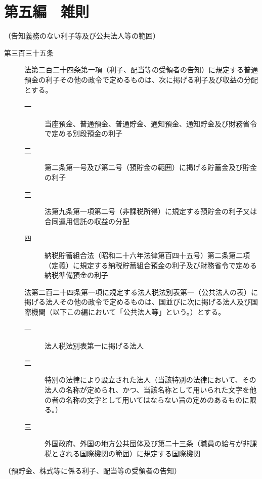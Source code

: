 \documentclass[twocolumn,a4j,10pt]{ltjtarticle}
\begin{document}
\part*{第五編　雑則}
\noindent\hspace{10pt}（告知義務のない利子等及び公共法人等の範囲）
\begin{description}
\item[第三百三十五条]法第二百二十四条第一項（利子、配当等の受領者の告知）に規定する普通預金の利子その他の政令で定めるものは、次に掲げる利子及び収益の分配とする。
\begin{description}
\item[一]当座預金、普通預金、普通貯金、通知預金、通知貯金及び財務省令で定める別段預金の利子
\item[二]第二条第一号及び第二号（預貯金の範囲）に掲げる貯蓄金及び貯金の利子
\item[三]法第九条第一項第二号（非課税所得）に規定する預貯金の利子又は合同運用信託の収益の分配
\item[四]納税貯蓄組合法（昭和二十六年法律第百四十五号）第二条第二項（定義）に規定する納税貯蓄組合預金の利子及び財務省令で定める納税準備預金の利子
\end{description}
\item[]法第二百二十四条第一項に規定する法人税法別表第一（公共法人の表）に掲げる法人その他の政令で定めるものは、国並びに次に掲げる法人及び国際機関（以下この編において「公共法人等」という。）とする。
\begin{description}
\item[一]法人税法別表第一に掲げる法人
\item[二]特別の法律により設立された法人（当該特別の法律において、その法人の名称が定められ、かつ、当該名称として用いられた文字を他の者の名称の文字として用いてはならない旨の定めのあるものに限る。）
\item[三]外国政府、外国の地方公共団体及び第二十三条（職員の給与が非課税とされる国際機関の範囲）に規定する国際機関
\end{description}
\end{description}
\noindent\hspace{10pt}（預貯金、株式等に係る利子、配当等の受領者の告知）
\end{document}
